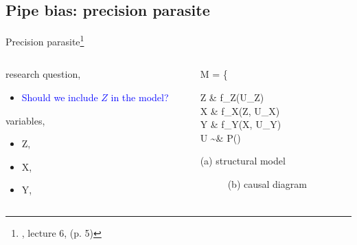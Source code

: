 \subsection{Pipe bias: precision parasite}
%
%
\begin{frame}[t, negative]
	\subsectionpage
\end{frame}
%
%
\begin{frame}
	{Precision parasite\footnote{\citet{McElreath_2022}, lecture 6, \citet{Cinelli_et_al_2021} (p. 5)}}
	\begin{columns}
		\begin{column}{0.5\textwidth}
			research question, 
			\begin{itemize}
				\item \textcolor{blue}{Should we include $Z$ in the model?}
			\end{itemize}
			
			variables,
			\begin{itemize}
				\item Z, 
				\item X, 
				\item Y, 
			\end{itemize}
		\end{column}
		\begin{column}{0.5\textwidth}  
			\begin{equ}
				M = \left\{ \begin{aligned} 
					Z \leftarrow & \; f_{Z}(U_{Z}) \\
					X \leftarrow & \; f_{X}(Z, U_{X}) \\
					Y \leftarrow & \; f_{Y}(X, U_{Y}) \\
					U \sim & \; P()
				\end{aligned} \right
				\caption*{(a) structural model}
			\end{equ}
			\begin{figure}
				\caption*{(b) causal diagram}
			\end{figure}
		\end{column}
	\end{columns}
\end{frame}
